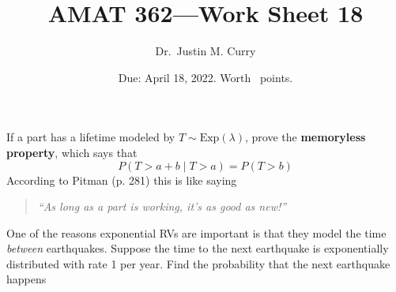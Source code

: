 \documentclass[addpoints,12pt]{exam}
\title{\vspace{-1in} AMAT 362---Work Sheet 18}
\date{Due: April 18, 2022. Worth \numpoints\ points.}
\author{Dr.~Justin M. Curry}
\begin{document}
\maketitle






\begin{questions}

\question[1] If a part has a lifetime modeled by $T\sim \text{Exp}(\lambda)$, prove the \textbf{memoryless property}, which says that
\[
	P(T>a + b \mid T > a) = P(T >b)
\]
According to Pitman (p. 281) this is like saying 
\begin{quote}
\centering
\emph{``As long as a part is working, it's as good as new!''}
\end{quote}

\vspace{1.2in}

\question[4] One of the reasons exponential RVs are important is that they model the time \emph{between} earthquakes. Suppose the time to the next earthquake is exponentially distributed with rate 1 per year. Find the probability that the next earthquake happens

\noaddpoints
{}
\addpoints


\end{questions}
\end{document}
